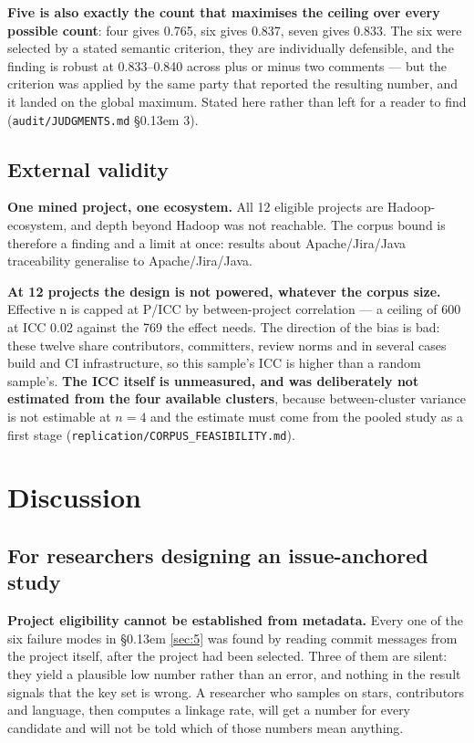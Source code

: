 \documentclass[sigconf,review,anonymous]{acmart}
\begin{document}
\textbf{Five is also exactly the count that maximises the ceiling over every possible count}: four gives 0.765, six gives 0.837, seven gives 0.833. The six were selected by a stated semantic criterion, they are individually defensible, and the finding is robust at 0.833--0.840 across plus or minus two comments --- but the criterion was applied by the same party that reported the resulting number, and it landed on the global maximum. Stated here rather than left for a reader to find (\texttt{audit/\allowbreak{}JUDGMENTS.\allowbreak{}md} \S\kern0.13em 3).

\subsection{External validity}
\label{sec:6.7}

\textbf{One mined project, one ecosystem.} All 12 eligible projects are Hadoop-ecosystem, and depth beyond Hadoop was not reachable. The corpus bound is therefore a finding and a limit at once: results about Apache/Jira/Java traceability generalise to Apache/Jira/Java.

\textbf{At 12 projects the design is not powered, whatever the corpus size.} Effective n is capped at P/ICC by between-project correlation --- a ceiling of 600 at ICC 0.02 against the 769 the effect needs. The direction of the bias is bad: these twelve share contributors, committers, review norms and in several cases build and CI infrastructure, so this sample's ICC is higher than a random sample's. \textbf{The ICC itself is unmeasured, and was deliberately not estimated from the four available clusters}, because between-cluster variance is not estimable at $n=4$ and the estimate must come from the pooled study as a first stage (\texttt{replication/\allowbreak{}CORPUS\_\allowbreak{}FEASIBILITY.\allowbreak{}md}).


\section{Discussion}
\label{sec:7}

\subsection{For researchers designing an issue-anchored study}
\label{sec:7.1}

\textbf{Project eligibility cannot be established from metadata.} Every one of the six failure modes in \S\kern0.13em \ref{sec:5} was found by reading commit messages from the project itself, after the project had been selected. Three of them are silent: they yield a plausible low number rather than an error, and nothing in the result signals that the key set is wrong. A researcher who samples on stars, contributors and language, then computes a linkage rate, will get a number for every candidate and will not be told which of those numbers mean anything.
\end{document}
